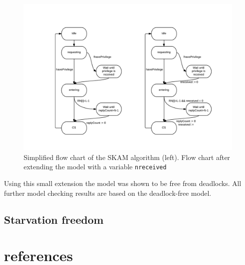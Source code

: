 \documentclass[a4paper,12pt]{article}
\begin{document}
\begin{figure}[!ht]
\begin{center}
\includegraphics[width=1.1\textwidth]{diagramboth.pdf}
 \caption[Close up of \textit{Hemidactylus} sp.]
   {Simplified flow chart of the SKAM algorithm (left). Flow chart after extending the model with a variable \texttt{nreceived}}
\end{center}
\end{figure}

Using this small extension the model was shown to be free from deadlocks. All further model checking results are based on the deadlock-free model.

\subsection{Starvation freedom}

\section{references}


\newpage
\label{ref:SKA}
\end{document}
